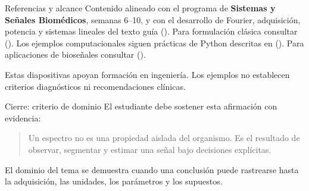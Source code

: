 \documentclass[
  ignorenonframetext,
  aspectratio=169,
  spanish,
]{beamer}
\providecommand{\faExclamation}{\faIcon{exclamation}}
\begin{document}
\begin{frame}{Referencias y alcance}
  \protect{}\label{referencias-y-alcance}
  Contenido alineado con el programa de \textbf{Sistemas y Señales
    Biomédicos}, semanas 6--10, y con el desarrollo de Fourier, adquisición,
  potencia y sistemas lineales del texto guía
  (). Para formulación clásica
  consultar (). Los
  ejemplos computacionales siguen prácticas de Python descritas en
  (). Para
  aplicaciones de bioseñales consultar
  ().

  \begin{tcolorbox}[enhanced jigsaw, arc=.35mm, bottomrule=.15mm, bottomtitle=1mm, breakable, colback=white, colbacktitle=quarto-callout-warning-color!10!white, colframe=quarto-callout-warning-color-frame, coltitle=black, left=2mm, leftrule=.75mm, opacityback=0, opacitybacktitle=0.6, rightrule=.15mm, title=\textcolor{quarto-callout-warning-color}{\faExclamationTriangle}\hspace{0.5em}{Advertencia}, titlerule=0mm, toprule=.15mm, toptitle=1mm]

    Estas diapositivas apoyan formación en ingeniería. Los ejemplos no
    establecen criterios diagnósticos ni recomendaciones clínicas.

  \end{tcolorbox}
\end{frame}

\begin{frame}{Cierre: criterio de dominio}
  \protect{}\label{cierre-criterio-de-dominio}
  El estudiante debe sostener esta afirmación con evidencia:

  \begin{quote}
    Un espectro no es una propiedad aislada del organismo. Es el resultado
    de observar, segmentar y estimar una señal bajo decisiones explícitas.
  \end{quote}

  \begin{tcolorbox}[enhanced jigsaw, arc=.35mm, bottomrule=.15mm, bottomtitle=1mm, breakable, colback=white, colbacktitle=quarto-callout-important-color!10!white, colframe=quarto-callout-important-color-frame, coltitle=black, left=2mm, leftrule=.75mm, opacityback=0, opacitybacktitle=0.6, rightrule=.15mm, title=\textcolor{quarto-callout-important-color}{\faExclamation}\hspace{0.5em}{Importante}, titlerule=0mm, toprule=.15mm, toptitle=1mm]

    El dominio del tema se demuestra cuando una conclusión puede rastrearse
    hasta la adquisición, las unidades, los parámetros y los supuestos.

  \end{tcolorbox}
\end{frame}
\end{document}
